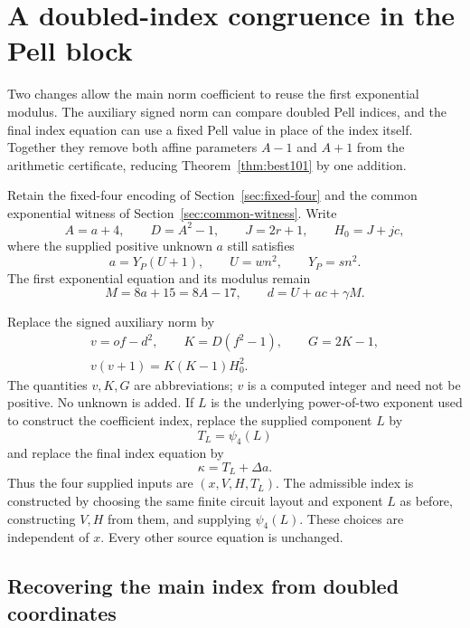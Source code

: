\section{A doubled-index congruence in the Pell block}
\label{sec:doubled-index}

Two changes allow the main norm coefficient to reuse the first
exponential modulus. The auxiliary signed norm can compare doubled
Pell indices, and the final index equation can use a fixed Pell value
in place of the index itself. Together they remove both affine
parameters $A-1$ and $A+1$ from the arithmetic certificate, reducing
Theorem~\ref{thm:best101} by one addition.

Retain the fixed-four encoding of Section~\ref{sec:fixed-four} and the
common exponential witness of Section~\ref{sec:common-witness}. Write
\[
 A=a+4,\qquad D=A^2-1,\qquad J=2r+1,\qquad H_0=J+jc,
\]
where the supplied positive unknown $a$ still satisfies
\[
 a=Y_P(U+1),\qquad U=wn^2,\qquad Y_P=sn^2.
\]
The first exponential equation and its modulus remain
\begin{equation}\label{eq:doubled-first-exponent}
 M=8a+15=8A-17,\qquad d=U+ac+\gamma M.
\end{equation}

Replace the signed auxiliary norm by
\begin{equation}\label{eq:doubled-auxiliary}
 \begin{gathered}
 v=of-d^2,\qquad K=D(f^2-1),\qquad G=2K-1,\\
 v(v+1)=K(K-1)H_0^2.
 \end{gathered}
\end{equation}
The quantities $v,K,G$ are abbreviations; $v$ is a computed integer
and need not be positive. No unknown is added. If $L$ is the underlying
power-of-two exponent used to construct the coefficient index, replace
the supplied component $L$ by
\[
 T_L=\psi_4(L)
\]
and replace the final index equation by
\begin{equation}\label{eq:doubled-fixed-index}
 \kappa=T_L+\Delta a.
\end{equation}
Thus the four supplied inputs are $(x,V,H,T_L)$. The admissible index
is constructed by choosing the same finite circuit layout and exponent
$L$ as before, constructing $V,H$ from them, and supplying $\psi_4(L)$.
These choices are independent of $x$. Every other source equation is
unchanged.

\subsection{Recovering the main index from doubled coordinates}

